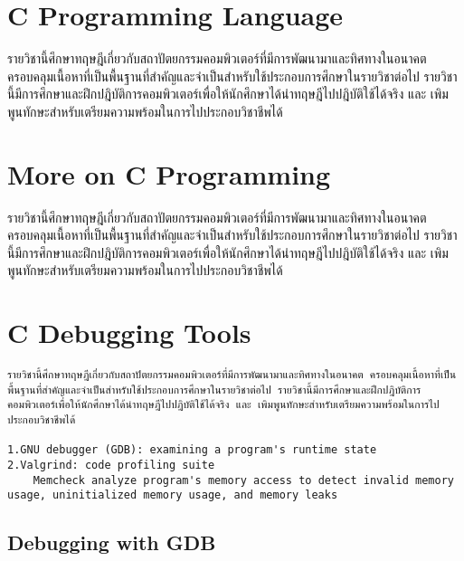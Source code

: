 \documentclass[
  notoc %
]{tufte-book}
\begin{document}
\hypertarget{sec:cprog}{%
\chapter{C Programming Language}\label{sec:cprog}}

รายวิชานี้ศึกษาทฤษฎีเกี่ยวกับสถาปัตยกรรมคอมพิวเตอร์ที่มีการพัฒนามาและทิศทางในอนาคต
ครอบคลุมเนื้อหาที่เป็นพื้นฐานที่สำคัญและจำเป็นสำหรับใช้ประกอบการศึกษาในรายวิชาต่อไป
รายวิชานี้มีการศึกษาและฝึกปฎิบัติการคอมพิวเตอร์เพื่อให้นักศึกษาได้นำทฤษฎีไปปฎิบัติใช้ได้จริง และ
เพิมพูนทักษะสำหรับเตรียมความพร้อมในการไปประกอบวิชาชีพได้

\hypertarget{sec:moreon_cprog}{%
\chapter{More on C Programming}\label{sec:moreon_cprog}}

รายวิชานี้ศึกษาทฤษฎีเกี่ยวกับสถาปัตยกรรมคอมพิวเตอร์ที่มีการพัฒนามาและทิศทางในอนาคต
ครอบคลุมเนื้อหาที่เป็นพื้นฐานที่สำคัญและจำเป็นสำหรับใช้ประกอบการศึกษาในรายวิชาต่อไป
รายวิชานี้มีการศึกษาและฝึกปฎิบัติการคอมพิวเตอร์เพื่อให้นักศึกษาได้นำทฤษฎีไปปฎิบัติใช้ได้จริง และ
เพิมพูนทักษะสำหรับเตรียมความพร้อมในการไปประกอบวิชาชีพได้

\hypertarget{sec:cdebuggingtools}{%
\chapter{C Debugging Tools}\label{sec:cdebuggingtools}}

\begin{lstlisting}
รายวิชานี้ศึกษาทฤษฎีเกี่ยวกับสถาปัตยกรรมคอมพิวเตอร์ที่มีการพัฒนามาและทิศทางในอนาคต ครอบคลุมเนื้อหาที่เป็นพื้นฐานที่สำคัญและจำเป็นสำหรับใช้ประกอบการศึกษาในรายวิชาต่อไป รายวิชานี้มีการศึกษาและฝึกปฎิบัติการคอมพิวเตอร์เพื่อให้นักศึกษาได้นำทฤษฎีไปปฎิบัติใช้ได้จริง และ เพิมพูนทักษะสำหรับเตรียมความพร้อมในการไปประกอบวิชาชีพได้

1.GNU debugger (GDB): examining a program's runtime state
2.Valgrind: code profiling suite
    Memcheck analyze program's memory access to detect invalid memory usage, uninitialized memory usage, and memory leaks
\end{lstlisting}

\hypertarget{sec:debugging-with-GDB}{%
\section{Debugging with GDB}\label{sec:debugging-with-GDB}}
\end{document}
